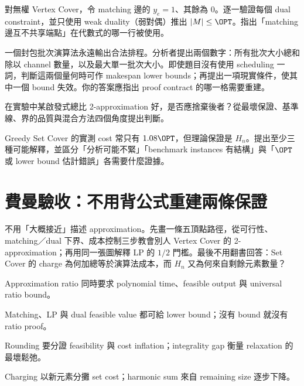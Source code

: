 \documentclass[11pt,a4paper,oneside,openany]{book}
\begin{document}
\begin{exercise}
對無權 Vertex Cover，令 matching 邊的 $y_e=1$、其餘為 0。逐一驗證每個 dual constraint，並只使用 weak duality（弱對偶）推出 $|M|\le\OPT$。指出「matching 邊互不共享端點」在代數式的哪一行被使用。
\end{exercise}
\begin{exercise}
一個封包批次演算法永遠輸出合法排程。分析者提出兩個數字：所有批次大小總和除以 channel 數量，以及最大單一批次大小。即使題目沒有使用 scheduling 一詞，判斷這兩個量何時可作 makespan lower bounds；再提出一項現實條件，使其中一個 bound 失效。你的答案應指出 proof contract 的哪一格需要重建。
\end{exercise}
\begin{exercise}
在實驗中某啟發式總比 2-approximation 好，是否應捨棄後者？從最壞保證、基準線、界的品質與混合方法四個角度提出判斷。
\end{exercise}
\begin{exercise}
Greedy Set Cover 的實測 cost 常只有 $1.08\OPT$，但理論保證是 $H_n$。提出至少三種可能解釋，並區分「分析可能不緊」「benchmark instances 有結構」與「$\OPT$ 或 lower bound 估計錯誤」各需要什麼證據。
\end{exercise}

\section{費曼驗收：不用背公式重建兩條保證}
\begin{feynmancheck}
不用「大概接近」描述 approximation。先畫一條五頂點路徑，從可行性、matching／dual 下界、成本控制三步教會別人 Vertex Cover 的 2-approximation；再用同一張圖解釋 LP 的 $1/2$ 門檻。最後不用翻書回答：Set Cover 的 charge 為何加總等於演算法成本，而 $H_n$ 又為何來自剩餘元素數量？
\end{feynmancheck}
\begin{chapterrecap}
\item Approximation ratio 同時要求 polynomial time、feasible output 與 universal ratio bound。
\item Matching、LP 與 dual feasible value 都可給 lower bound；沒有 bound 就沒有 ratio proof。
\item Rounding 要分證 feasibility 與 cost inflation；integrality gap 衡量 relaxation 的最壞鬆弛。
\item Charging 以新元素分攤 set cost；harmonic sum 來自 remaining size 逐步下降。
\end{chapterrecap}
\end{document}
